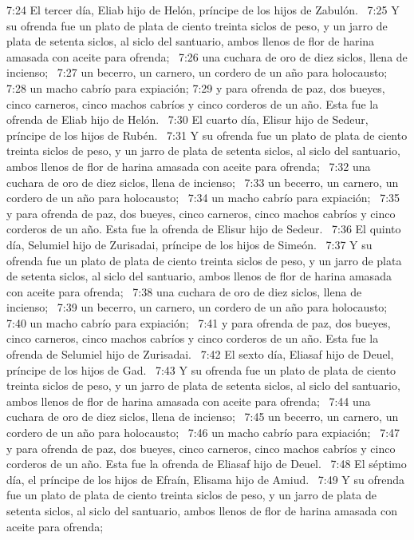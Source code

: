 7:24 El tercer día, Eliab hijo de Helón, príncipe de los hijos de Zabulón.  
7:25 Y su ofrenda fue un plato de plata de ciento treinta siclos de peso, y un jarro de plata de setenta siclos, al siclo del santuario, ambos llenos de flor de harina amasada con aceite para ofrenda;  
7:26 una cuchara de oro de diez siclos, llena de incienso;  
7:27 un becerro, un carnero, un cordero de un año para holocausto;  
7:28 un macho cabrío para expiación; 
7:29 y para ofrenda de paz, dos bueyes, cinco carneros, cinco machos cabríos y cinco corderos de un año. Esta fue la ofrenda de Eliab hijo de Helón.  
7:30 El cuarto día, Elisur hijo de Sedeur, príncipe de los hijos de Rubén.  
7:31 Y su ofrenda fue un plato de plata de ciento treinta siclos de peso, y un jarro de plata de setenta siclos, al siclo del santuario, ambos llenos de flor de harina amasada con aceite para ofrenda;  
7:32 una cuchara de oro de diez siclos, llena de incienso;  
7:33 un becerro, un carnero, un cordero de un año para holocausto;  
7:34 un macho cabrío para expiación;  
7:35 y para ofrenda de paz, dos bueyes, cinco carneros, cinco machos cabríos y cinco corderos de un año. Esta fue la ofrenda de Elisur hijo de Sedeur.  
7:36 El quinto día, Selumiel hijo de Zurisadai, príncipe de los hijos de Simeón.  
7:37 Y su ofrenda fue un plato de plata de ciento treinta siclos de peso, y un jarro de plata de setenta siclos, al siclo del santuario, ambos llenos de flor de harina amasada con aceite para ofrenda;  
7:38 una cuchara de oro de diez siclos, llena de incienso;  
7:39 un becerro, un carnero, un cordero de un año para holocausto;  
7:40 un macho cabrío para expiación;  
7:41 y para ofrenda de paz, dos bueyes, cinco carneros, cinco machos cabríos y cinco corderos de un año. Esta fue la ofrenda de Selumiel hijo de Zurisadai.  
7:42 El sexto día, Eliasaf hijo de Deuel, príncipe de los hijos de Gad.  
7:43 Y su ofrenda fue un plato de plata de ciento treinta siclos de peso, y un jarro de plata de setenta siclos, al siclo del santuario, ambos llenos de flor de harina amasada con aceite para ofrenda;  
7:44 una cuchara de oro de diez siclos, llena de incienso;  
7:45 un becerro, un carnero, un cordero de un año para holocausto;  
7:46 un macho cabrío para expiación;  
7:47 y para ofrenda de paz, dos bueyes, cinco carneros, cinco machos cabríos y cinco corderos de un año. Esta fue la ofrenda de Eliasaf hijo de Deuel.  
7:48 El séptimo día, el príncipe de los hijos de Efraín, Elisama hijo de Amiud.  
7:49 Y su ofrenda fue un plato de plata de ciento treinta siclos de peso, y un jarro de plata de setenta siclos, al siclo del santuario, ambos llenos de flor de harina amasada con aceite para ofrenda;  
